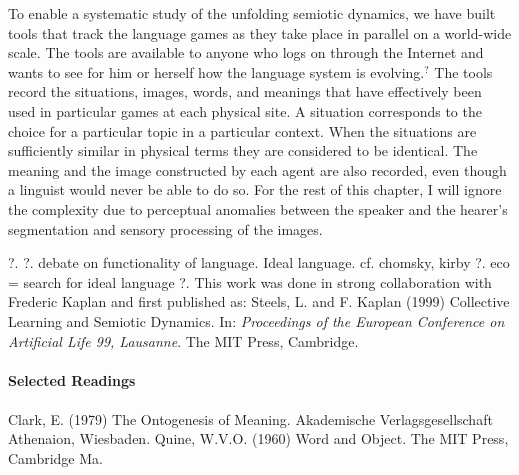 To enable a systematic study of the unfolding semiotic dynamics, 
we have built tools that track the language games 
as they take place in parallel on a world-wide scale. The tools 
are available to anyone who logs on through the Internet
and wants to see for him or herself how the language
system is evolving.$^?$ The tools record the 
situations, images, words, and meanings that have 
effectively been used in particular games at each 
physical site. A situation corresponds to the 
choice for a particular topic in a particular
context. When the situations are 
sufficiently similar in physical terms 
they are considered to be identical. The meaning and the 
image constructed by each agent are also 
recorded, even though a linguist would never be able to 
do so. For the rest of this chapter, I will ignore 
the complexity due to perceptual anomalies between 
the speaker and the hearer's segmentation and sensory 
processing of the images. 

\vspace{0.2cm}
\newline
\hspace{-0.5cm}
?. 
\vspace{0.2cm}
\newline
\hspace{-0.5cm}
?. debate on functionality of language. Ideal language. 
cf. chomsky, kirby 
\vspace{0.2cm}
\newline
\hspace{-0.5cm}
?. eco = search for ideal language
\vspace{0.2cm}
\newline
\hspace{-0.5cm}
?. This work was done in strong collaboration with 
Frederic Kaplan and first published as: 
Steels, L. and F. Kaplan (1999) Collective Learning and Semiotic 
Dynamics. In: {\itshape Proceedings of the European Conference on 
Artificial Life 99, Lausanne}. The MIT Press, Cambridge. 

\bigskip
\paragraph{\bf Selected Readings}
\paragraph{}
\footnotesize

\hspace{-0.5cm}
Clark, E. (1979) The Ontogenesis of Meaning. Akademische
Verlagsgesellschaft Athenaion, Wiesbaden. 
\vspace{0.2cm}
\newline
\hspace{-0.5cm}
Quine, W.V.O. (1960) Word and Object. The MIT Press, 
Cambridge Ma.
\normalsize
